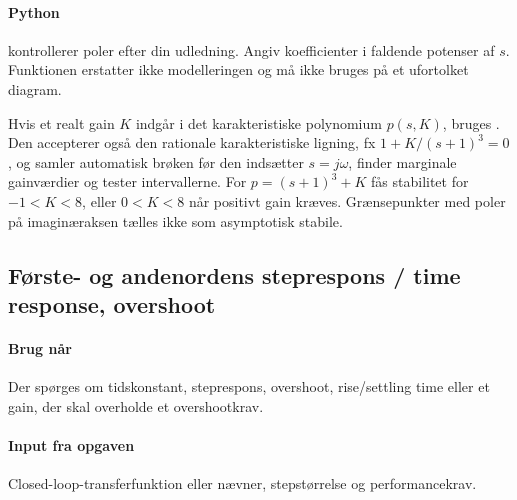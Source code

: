 \paragraph{Python}
 kontrollerer poler efter din udledning.
Angiv koefficienter i faldende potenser af \(s\). Funktionen erstatter ikke modelleringen
og må ikke bruges på et ufortolket diagram.

Hvis et realt gain \(K\) indgår i det karakteristiske polynomium \(p(s,K)\), bruges
. Den accepterer også den rationale
karakteristiske ligning, fx \(1+K/(s+1)^3=0\), og samler automatisk brøken før
den indsætter \(s=j\omega\), finder marginale gainværdier og tester intervallerne. For
\(p=(s+1)^3+K\) fås stabilitet for \(-1<K<8\), eller \(0<K<8\) når positivt gain
kræves. Grænsepunkter med poler på imaginæraksen tælles ikke som asymptotisk stabile.

\subsection{Første- og andenordens steprespons / time response, overshoot}
\label{sec:time}

\paragraph{Brug når}
Der spørges om tidskonstant, steprespons, overshoot, rise/settling time eller et gain,
der skal overholde et overshootkrav.

\paragraph{Input fra opgaven}
Closed-loop-transferfunktion eller nævner, stepstørrelse og performancekrav.

